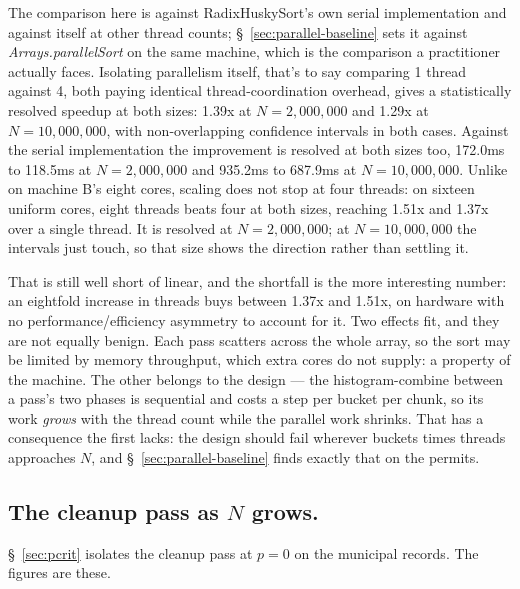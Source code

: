 \documentclass[twoside,leqno,twocolumn]{article}
\begin{document}
The comparison here is against RadixHuskySort's own serial implementation and against itself at other
thread counts; \S~\ref{sec:parallel-baseline} sets it against \mbox{\textit{Arrays.parallelSort}} on the
same machine, which is the comparison a practitioner actually faces.
Isolating parallelism itself, that's to say comparing 1 thread against 4, both paying identical thread-coordination overhead,
gives a statistically resolved speedup at both sizes: 1.39x at $N=2{,}000{,}000$ and 1.29x at $N=10{,}000{,}000$,
with non-overlapping confidence intervals in both cases.
Against the serial implementation the improvement is resolved at both sizes too,
172.0ms to 118.5ms at $N=2{,}000{,}000$ and 935.2ms to 687.9ms at $N=10{,}000{,}000$.
Unlike on machine B's eight cores, scaling does not stop at four threads:
on sixteen uniform cores, eight threads beats four at both sizes,
reaching 1.51x and 1.37x over a single thread.
It is resolved at $N=2{,}000{,}000$; at $N=10{,}000{,}000$ the intervals just touch,
so that size shows the direction rather than settling it.

That is still well short of linear, and the shortfall is the more interesting number:
an eightfold increase in threads buys between 1.37x and 1.51x,
on hardware with no performance/efficiency asymmetry to account for it.
Two effects fit, and they are not equally benign.
Each pass scatters across the whole array, so the sort may be limited by memory throughput, which extra
cores do not supply: a property of the machine.
The other belongs to the design --- the histogram-combine between a pass's two phases is sequential and
costs a step per bucket per chunk, so its work \emph{grows} with the thread count while the parallel
work shrinks.
That has a consequence the first lacks: the design should fail wherever buckets times threads approaches
$N$, and \S~\ref{sec:parallel-baseline} finds exactly that on the permits.

\subsection{The cleanup pass as \texorpdfstring{$N$}{N} grows.}
\label{sec:cleanup-scaling}

\S~\ref{sec:pcrit} isolates the cleanup pass at $p = 0$ on the municipal records. The figures are
these.
\end{document}
